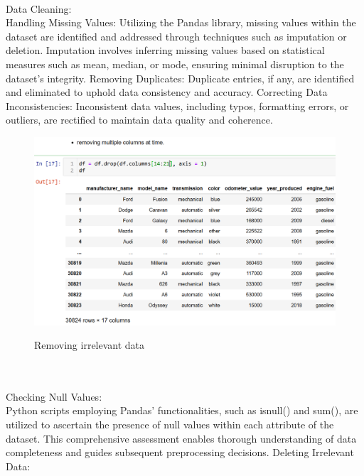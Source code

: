 \documentclass{article}
\begin{document}
{\begin{figure}[htbp]
  \vspace{0.3cm}
\end{figure}
\\
\newpage
Data Cleaning:
\\
Handling Missing Values: Utilizing the Pandas library, missing values within the dataset are identified and addressed through techniques such as imputation or deletion. Imputation involves inferring missing values based on statistical measures such as mean, median, or mode, ensuring minimal disruption to the dataset's integrity.
Removing Duplicates: Duplicate entries, if any, are identified and eliminated to uphold data consistency and accuracy.
Correcting Data Inconsistencies: Inconsistent data values, including typos, formatting errors, or outliers, are rectified to maintain data quality and coherence.
\begin{figure}[htbp]
  \centering
  \vspace{0.3cm}
  \includegraphics[width=1\textwidth]{Figures/Python/removing multiple columns.png}\\
  \caption{Removing irrelevant data}
  \vspace{0.3cm}
\end{figure}

\\
\\
Checking Null Values:
\\
Python scripts employing Pandas' functionalities, such as isnull() and sum(), are utilized to ascertain the presence of null values within each attribute of the dataset. This comprehensive assessment enables thorough understanding of data completeness and guides subsequent preprocessing decisions.
Deleting Irrelevant Data:

}
\end{document}
